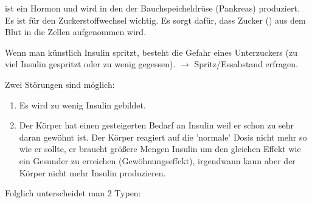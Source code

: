 {%
  ist ein Hormon und wird in den 
der Bauchspeicheldrüse (Pankreas) produziert. Es ist für
den Zuckerstoffwechsel wichtig. Es sorgt dafür, dass Zucker
() aus dem Blut in die Zellen aufgenommen wird.



Wenn man künstlich Insulin spritzt, besteht die Gefahr eines
Unterzuckers (zu viel Insulin gespritzt oder zu wenig
gegessen). ${\rightarrow}$  Spritz/Essabstand
er\-fra\-gen.
}{

}{}{}{}




Zwei Störungen sind möglich:

\begin{enumerate}
  \item Es wird zu wenig Insulin gebildet.
  \item Der Körper hat einen gesteigerten Bedarf an Insulin weil er schon
  zu sehr daran gewöhnt ist. Der Körper reagiert auf die 'normale' Dosis
  nicht mehr so wie er sollte, er braucht größere Mengen Insulin um
  den gleichen Effekt wie ein Gesunder zu erreichen (Gewöhnungseffekt),
  irgendwann kann aber der Körper nicht mehr Insulin produzieren.
\end{enumerate}

Folglich unterscheidet man 2 Typen:



